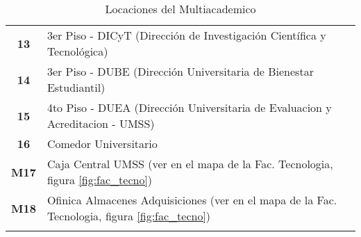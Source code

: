 \begin{longtable}{ c  X }
\textbf{13}
&
3{\tiny er} Piso - DICyT (Dirección de Investigación Científica y Tecnológica)
\\



\textbf{14}
&
3{\tiny er} Piso - DUBE (Dirección Universitaria de Bienestar Estudiantil)
\\


\textbf{15}
&
4{\tiny to} Piso - DUEA (Dirección Universitaria de Evaluacion y Acreditacion - UMSS)
\\

\textbf{16}
&
Comedor Universitario
\\


\textbf{M17}
&
Caja Central UMSS (ver en el mapa de la Fac. Tecnologia, figura \ref{fig:fac_tecno})
\\


\textbf{M18}
&
Ofinica Almacenes Adquisiciones (ver en el mapa de la Fac. Tecnologia, figura \ref{fig:fac_tecno})
\\

      \bottomrule
      \caption{Locaciones del Multiacademico}
      \label{tab:lugares_multiacademico}
    \end{longtable}
